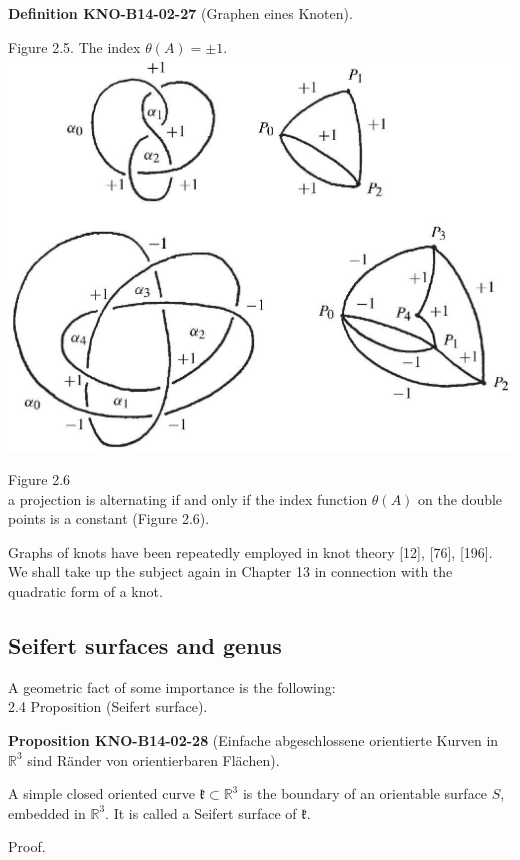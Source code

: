\documentclass[10pt, letterpaper]{article}
\newcommand{\R}{\mathbb{R}}
\newcommand{\CustomHeading}[3]{%
  \par\medskip\noindent%
  \textbf{#1 #2} \textnormal{(#3)}.\enskip%
}
\newenvironment{DEF}[2]{\begin{unitbox}\CustomHeading{Definition}{#1}{#2}}{\end{unitbox}}
\newenvironment{PROP}[2]{\begin{unitbox}\CustomHeading{Proposition}{#1}{#2}}{\end{unitbox}}
\begin{document}
\begin{DEF}{KNO-B14-02-27}{Graphen eines Knoten}
Figure 2.5. The index $\theta(A)= \pm 1$.\\
\includegraphics[scale=0.2, center]{2025_05_21_9c06be8de7a55410f8c1g-033}

Figure 2.6\\
a projection is alternating if and only if the index function $\theta(A)$ on the double points is a constant (Figure 2.6).

Graphs of knots have been repeatedly employed in knot theory [12], [76], [196]. We shall take up the subject again in Chapter 13 in connection with the quadratic form of a knot.
\end{DEF}



\subsection{Seifert surfaces and genus}

A geometric fact of some importance is the following:\\

2.4 Proposition (Seifert surface). 

\begin{PROP}{KNO-B14-02-28}{Einfache abgeschlossene orientierte Kurven in $\R^3$ sind Ränder von orientierbaren Flächen}
A simple closed oriented curve $\mathfrak{k} \subset \mathbb{R}^{3}$ is the boundary of an orientable surface $S$, embedded in $\mathbb{R}^{3}$. It is called a Seifert surface of $\mathfrak{k}$.
\end{PROP}

Proof. 
\end{document}
